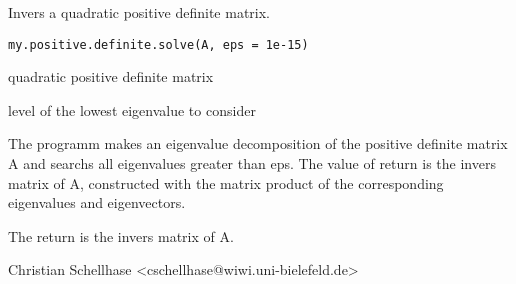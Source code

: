 \begin{Description}\relax
Invers a quadratic positive definite matrix.
\end{Description}
\begin{Usage}
\begin{verbatim}
my.positive.definite.solve(A, eps = 1e-15)
\end{verbatim}
\end{Usage}
\begin{Arguments}
\begin{ldescription}
\item[\code{A}] quadratic positive definite matrix
\item[\code{eps}] level of the lowest eigenvalue to consider
\end{ldescription}
\end{Arguments}
\begin{Details}\relax
The programm makes an eigenvalue decomposition of the positive definite matrix A and searchs all eigenvalues greater than eps. The value of return is the invers matrix of A, constructed with the matrix product of the corresponding eigenvalues and eigenvectors.
\end{Details}
\begin{Value}
The return is the invers matrix of A.
\end{Value}
\begin{Author}\relax
Christian Schellhase <cschellhase@wiwi.uni-bielefeld.de>
\end{Author}

